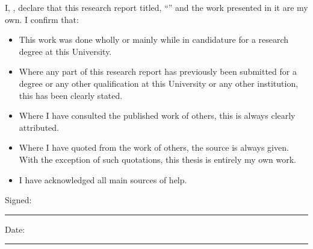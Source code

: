 \documentclass[
12pt, %
oneside, %
english, %
onehalfspacing, %
liststotoc, %
headsepline, %
chapterinoneline, %
svgnames %
]{MastersDoctoralThesis} %
\begin{document}

\begin{declaration}
\addchaptertocentry{\authorshipname} %
\noindent I, \authorname, declare that this research report titled, \enquote{\ttitle} and the work presented in it are my own. I confirm that:

\begin{itemize} 
\item This work was done wholly or mainly while in candidature for a research degree at this University.
\item Where any part of this research report has previously been submitted for a degree or any other qualification at this University or any other institution, this has been clearly stated.
\item Where I have consulted the published work of others, this is always clearly attributed.
\item Where I have quoted from the work of others, the source is always given. With the exception of such quotations, this thesis is entirely my own work.
\item I have acknowledged all main sources of help.\\
\end{itemize}
 
\noindent Signed:\\
\rule[0.5em]{25em}{0.5pt} %
 
\noindent Date:\\
\rule[0.5em]{25em}{0.5pt} %
\end{declaration}

\clearpage


\end{document}
